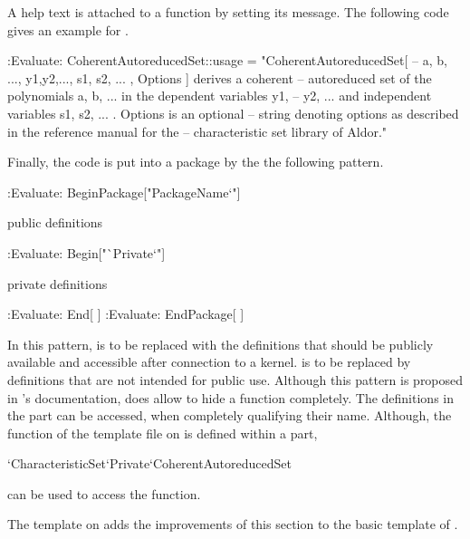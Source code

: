 A help text is attached to a function by setting its  message. The following code gives an example for .


\begin{mathematicaprogram}
:Evaluate:      CoherentAutoreducedSet::usage = "CoherentAutoreducedSet[          --
    { a, b, ...}, {y1,y2,...}, { s1, s2, ... }, Options ] derives a coherent      --
    autoreduced set of the polynomials a, b, ... in the dependent variables y1,   --
    y2,  ... and independent variables s1, s2, ... . Options is an optional       --
    string denoting options as described in the reference manual for the          --
    characteristic set library of Aldor."
\end{mathematicaprogram}

Finally, the code is put into a package by the the following pattern. 

\begin{mathematicaprogram}
:Evaluate:      BeginPackage["PackageName`"]

    public definitions

:Evaluate:      Begin["`Private`"]

    private definitions

:Evaluate:      End[ ]
:Evaluate:      EndPackage[ ]
\end{mathematicaprogram}

In this pattern,  is to be replaced with the definitions that should be publicly available and accessible after connection to a kernel.
 is to be replaced by definitions that are not intended for public use. Although this pattern is proposed in \MathLink's documentation, \Mathematica does allow to hide a function completely. The definitions in the  part can be accessed, when completely qualifying their name. Although, the function  of the \MathLink template file on  is defined within a  part, 

\begin{mathematicaprogram}
`CharacteristicSet`Private`CoherentAutoreducedSet
\end{mathematicaprogram}

can be used to access the function.

The \MathLink template on  adds the improvements of this section to the basic template of .

